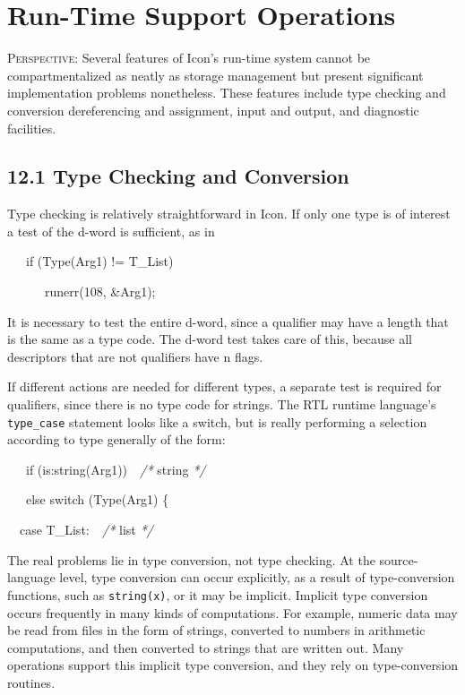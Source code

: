 \chapter{Run-Time Support Operations}

\textsc{Perspective}: Several features of Icon's run-time system
cannot be compartmentalized as neatly as storage management but
present significant implementation problems nonetheless. These
features include type checking and conversion dereferencing and
assignment, input and output, and diagnostic facilities.

\section[12.1 Type Checking and Conversion]{12.1 Type Checking and Conversion}

Type checking is relatively straightforward in Icon. If only one type
is of interest a test of the d-word is sufficient, as in

{\ttfamily\mdseries
\ \ \ if (Type(Arg1) != T\_List)}

{\ttfamily\mdseries
\ \ \ \ \ \ runerr(108, \&Arg1);}

It is necessary to test the entire d-word, since a qualifier may have
a length that is the same as a type code. The d-word test takes care
of this, because all descriptors that are not qualifiers have n flags.

If different actions are needed for different types, a separate test
is required for qualifiers, since there is no type code for
strings. The RTL runtime language's \texttt{type\_case} statement
looks like a switch, but is really performing a selection according to
type generally of the form:

{\ttfamily\mdseries
\ \ \ if (is:string(Arg1))\textit{\ \ /* }string \textit{*/}}

{\ttfamily\mdseries
\ \ \ else switch (Type(Arg1) \{}

{\ttfamily\mdseries
\ \ case T\_List:\textit{\ \ /* }list \textit{*/}}


The real problems lie in type conversion, not type checking. At the
source-language level, type conversion can occur explicitly, as a
result of type-conversion functions, such as \texttt{string(x)}, or it
may be implicit. Implicit type conversion occurs frequently in many
kinds of computations. For example, numeric data may be read from
files in the form of strings, converted to numbers in arithmetic
computations, and then converted to strings that are written out.
Many operations support this implicit type conversion, and they rely
on type-conversion routines.

